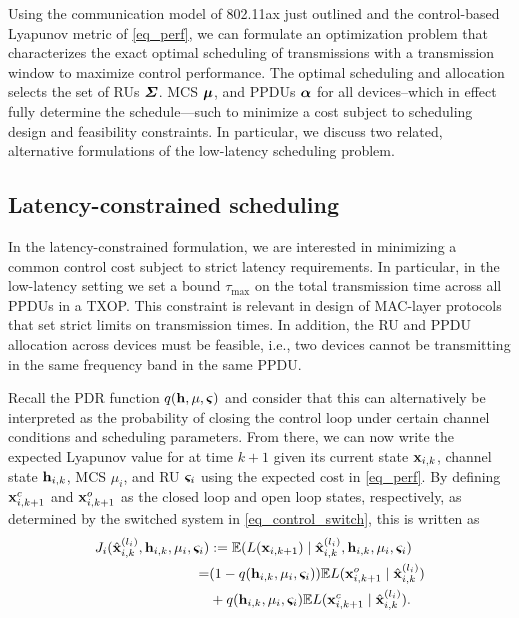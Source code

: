 Using the communication model of 802.11ax just outlined and the control-based Lyapunov metric of \eqref{eq_perf}, we can formulate an optimization problem that characterizes the exact optimal scheduling of transmissions with a transmission window to maximize control performance. The optimal scheduling and allocation selects the set of RUs $\boldsymbol{\Sigma}$. MCS $\boldsymbol{\mu}$, and PPDUs $\boldsymbol{\alpha}$ for all devices--which in effect fully determine the schedule---such to minimize a cost subject to scheduling design and feasibility constraints. In particular, we discuss two related, alternative formulations of the low-latency scheduling problem.

\subsection{Latency-constrained scheduling}\label{sec_optimal_a}
In the latency-constrained formulation, we are interested in minimizing a common control cost subject to strict latency requirements. In particular, in the low-latency setting we set a bound $\tau_{\max}$ on the total transmission time across all PPDUs in a TXOP. This constraint is relevant in design of MAC-layer protocols that set strict limits on transmission times. In addition, the RU and PPDU allocation across devices must be feasible, i.e., two devices cannot be transmitting in the same frequency band in the same PPDU. 


Recall the PDR function $q({\mathbf h},\mu,\boldsymbol{\varsigma})$ and consider that this can alternatively be interpreted as the probability of closing the control loop under certain channel conditions and scheduling parameters. From there, we can now write the expected Lyapunov value for at time $k+1$ given its current state ${\mathbf x}_{i,k}$, channel state ${\mathbf h}_{i,k}$, MCS $\mu_i$, and RU $\boldsymbol{\varsigma}_i$ using the expected cost in \eqref{eq_perf}. By defining ${\mathbf x}_{i,k+1}^c$ and ${\mathbf x}_{i,k+1}^o$ as the closed loop and open loop states, respectively, as determined by the switched system in \eqref{eq_control_switch}, this is written as
%
\begin{align}
J_i(\hbx^{(l_i)}_{i,k},\bbh_{i,k},\mu_i,\bbsigma_i) &:= \E (L(\bbx_{i,k+1}) \mid \hbx^{(l_i)}_{i,k},\bbh_{i,k},\mu_i,\bbsigma_i) \nonumber \\
=& (1-q(\bbh_{i,k},\mu_i,\bbsigma_i))  \E L(\bbx_{i,k+1}^o \mid \hbx^{(l_i)}_{i,k}) \nonumber \\
&+q(\bbh_{i,k},\mu_i,\bbsigma_i) \E L(\bbx_{i,k+1}^c \mid \hbx^{(l_i)}_{i,k}). \label{eq_lyap_p}
\end{align}
%

